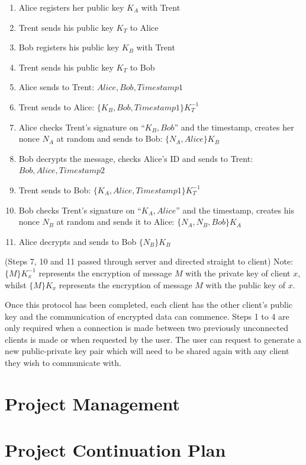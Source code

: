 \documentclass[a4paper,11pt]{article}
\begin{document}
\begin{enumerate}
  \item Alice registers her public key $ K_{A} $ with Trent
  \item Trent sends his public key $ K_{T} $ to Alice
  \item Bob registers his public key $ K_{B} $ with Trent
  \item Trent sends his public key $ K_{T} $ to Bob
  \item Alice sends to Trent: $ Alice, Bob, Timestamp1 $
  \item Trent sends to Alice: $ \{K_{B},Bob, Timestamp1\} K_{T}^{-1} $
  \item Alice checks Trent’s signature on “$ {K_{B},Bob} $” and the timestamp, creates her nonce $ N_{A} $ at random and sends to Bob: $ \{N_{A} , Alice \}K_{B} $
  \item Bob decrypts the message, checks Alice’s ID and sends to Trent: $ Bob, Alice, Timestamp2 $
  \item Trent sends to Bob: $ \{K_{A} , Alice, Timestamp1\}K_{T}^{-1} $
  \item Bob checks Trent’s signature on “$ K_{A}, Alice $” and the timestamp, creates his nonce $ N_{B} $ at random and sends it to Alice: $ \{N_{A}, N_{B}, Bob\}K_{A} $
  \item Alice decrypts and sends to Bob $ \{N_{B}\}K_{B} $
\end{enumerate}

(Steps 7, 10 and 11 passed through server and directed straight to client)
Note: $ \{M\}K_{x}^{-1} $ represents the encryption of message $ M $ with the private key of client $ x $, whilst $ \{M\}K_{x} $ represents the encryption of message $ M $ with the public key of $ x $.

Once this protocol has been completed, each client has the other client’s public key and the communication of encrypted data can commence. Steps 1 to 4 are only required when a connection is made between two previously unconnected clients is made or when requested by the user. The user can request to generate a new public-private key pair which will need to be shared again with any client they wish to communicate with. 

\section{Project Management}

\section{Project Continuation Plan}
\end{document}
